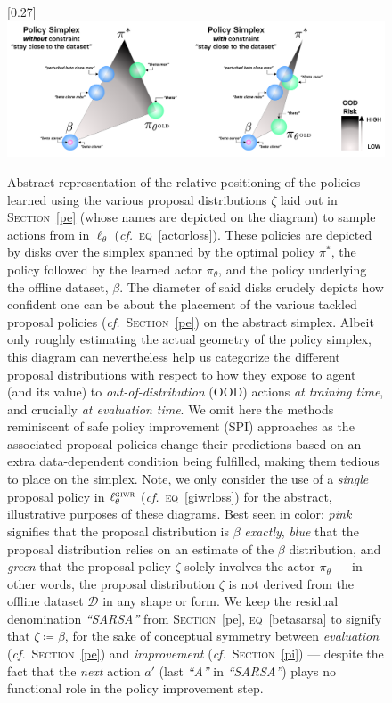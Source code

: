 \begin{figure}[!h]
  \center\scalebox{0.27}[0.27]{\includegraphics{Diags/policy_simplex.pdf}}
  \caption{Abstract representation of the relative positioning of the policies learned
  using the various proposal distributions $\zeta$ laid out in \textsc{Section}~\ref{pe}
  (whose names are depicted on the diagram)
  to sample actions from in $\ell_\theta$ (\textit{cf.}~\textsc{eq}~\ref{actorloss}).
  These policies are depicted by disks over the simplex spanned by the optimal policy $\pi^*$, the policy
  followed by the learned actor $\pi_\theta$, and the policy underlying the offline dataset, $\beta$.
  The diameter of said disks crudely depicts how confident one can be about the placement of the various
  tackled proposal policies (\textit{cf.}~\textsc{Section}~\ref{pe}) on the abstract simplex.
  Albeit only roughly estimating the actual geometry of the policy simplex,
  this diagram can nevertheless help us categorize the
  different proposal distributions with respect to how they expose to agent (and its value) to
  \emph{out-of-distribution} (OOD) actions \emph{at training time}, and crucially \emph{at evaluation time}.
  We omit here the methods reminiscent of safe policy improvement (SPI) approaches as the associated proposal
  policies change their predictions based on an extra data-dependent condition being fulfilled,
  making them tedious to place on the simplex.
  Note, we only consider the use of a \emph{single} proposal policy
  in $\ell^\textsc{giwr}_\theta$ (\textit{cf.}~\textsc{eq}~\ref{giwrloss})
  for the abstract, illustrative purposes of these diagrams.
  Best seen in color:
  \textit{pink} signifies that the proposal distribution is $\beta$ \emph{exactly},
  \textit{blue} that the proposal distribution relies on an
  estimate of the $\beta$ distribution, and \textit{green} that the proposal policy $\zeta$
  solely involves the actor $\pi_\theta$ --- in other words, the proposal distribution
  $\zeta$ is not derived from the offline dataset $\mathcal{D}$
  in any shape or form.
  We keep the residual denomination \textit{``SARSA''} from \textsc{Section}~\ref{pe},
  \textsc{eq}~\ref{betasarsa} to signify that $\zeta \coloneqq \beta$, for the sake of
  conceptual symmetry between \emph{evaluation} (\textit{cf.}~\textsc{Section}~\ref{pe})
  and \emph{improvement} (\textit{cf.}~\textsc{Section}~\ref{pi})
  --- despite the fact that the \textit{next} action $a'$ (last \textit{``A''} in \textit{``SARSA''})
  plays no functional role in the  policy improvement step.}
  \label{policysimplex}
\end{figure}

